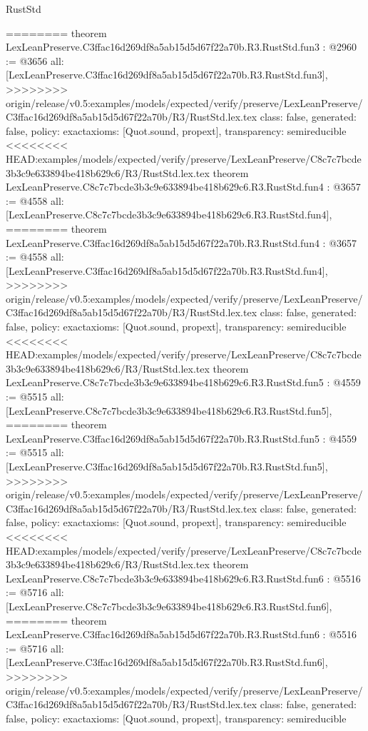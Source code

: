 \begin{lexlean}{RustStd}
\begin{coremodule}
{\begin{coremodule}
{{{{{{========
theorem LexLeanPreserve.C3ffac16d269df8a5ab15d5d67f22a70b.R3.RustStd.fun3 : @2960 := @3656 {
  all: [LexLeanPreserve.C3ffac16d269df8a5ab15d5d67f22a70b.R3.RustStd.fun3],
>>>>>>>> origin/release/v0.5:examples/models/expected/verify/preserve/LexLeanPreserve/C3ffac16d269df8a5ab15d5d67f22a70b/R3/RustStd.lex.tex
  class: false,
  generated: false,
  policy: exact{axioms: [Quot.sound, propext]},
  transparency: semireducible
}
<<<<<<<< HEAD:examples/models/expected/verify/preserve/LexLeanPreserve/C8c7c7bcde3b3c9e633894be418b629c6/R3/RustStd.lex.tex
theorem LexLeanPreserve.C8c7c7bcde3b3c9e633894be418b629c6.R3.RustStd.fun4 : @3657 := @4558 {
  all: [LexLeanPreserve.C8c7c7bcde3b3c9e633894be418b629c6.R3.RustStd.fun4],
========
theorem LexLeanPreserve.C3ffac16d269df8a5ab15d5d67f22a70b.R3.RustStd.fun4 : @3657 := @4558 {
  all: [LexLeanPreserve.C3ffac16d269df8a5ab15d5d67f22a70b.R3.RustStd.fun4],
>>>>>>>> origin/release/v0.5:examples/models/expected/verify/preserve/LexLeanPreserve/C3ffac16d269df8a5ab15d5d67f22a70b/R3/RustStd.lex.tex
  class: false,
  generated: false,
  policy: exact{axioms: [Quot.sound, propext]},
  transparency: semireducible
}
<<<<<<<< HEAD:examples/models/expected/verify/preserve/LexLeanPreserve/C8c7c7bcde3b3c9e633894be418b629c6/R3/RustStd.lex.tex
theorem LexLeanPreserve.C8c7c7bcde3b3c9e633894be418b629c6.R3.RustStd.fun5 : @4559 := @5515 {
  all: [LexLeanPreserve.C8c7c7bcde3b3c9e633894be418b629c6.R3.RustStd.fun5],
========
theorem LexLeanPreserve.C3ffac16d269df8a5ab15d5d67f22a70b.R3.RustStd.fun5 : @4559 := @5515 {
  all: [LexLeanPreserve.C3ffac16d269df8a5ab15d5d67f22a70b.R3.RustStd.fun5],
>>>>>>>> origin/release/v0.5:examples/models/expected/verify/preserve/LexLeanPreserve/C3ffac16d269df8a5ab15d5d67f22a70b/R3/RustStd.lex.tex
  class: false,
  generated: false,
  policy: exact{axioms: [Quot.sound, propext]},
  transparency: semireducible
}
<<<<<<<< HEAD:examples/models/expected/verify/preserve/LexLeanPreserve/C8c7c7bcde3b3c9e633894be418b629c6/R3/RustStd.lex.tex
theorem LexLeanPreserve.C8c7c7bcde3b3c9e633894be418b629c6.R3.RustStd.fun6 : @5516 := @5716 {
  all: [LexLeanPreserve.C8c7c7bcde3b3c9e633894be418b629c6.R3.RustStd.fun6],
========
theorem LexLeanPreserve.C3ffac16d269df8a5ab15d5d67f22a70b.R3.RustStd.fun6 : @5516 := @5716 {
  all: [LexLeanPreserve.C3ffac16d269df8a5ab15d5d67f22a70b.R3.RustStd.fun6],
>>>>>>>> origin/release/v0.5:examples/models/expected/verify/preserve/LexLeanPreserve/C3ffac16d269df8a5ab15d5d67f22a70b/R3/RustStd.lex.tex
  class: false,
  generated: false,
  policy: exact{axioms: [Quot.sound, propext]},
  transparency: semireducible
}}}}}}}}}}
\end{coremodule}}
\end{coremodule}
\end{lexlean}
